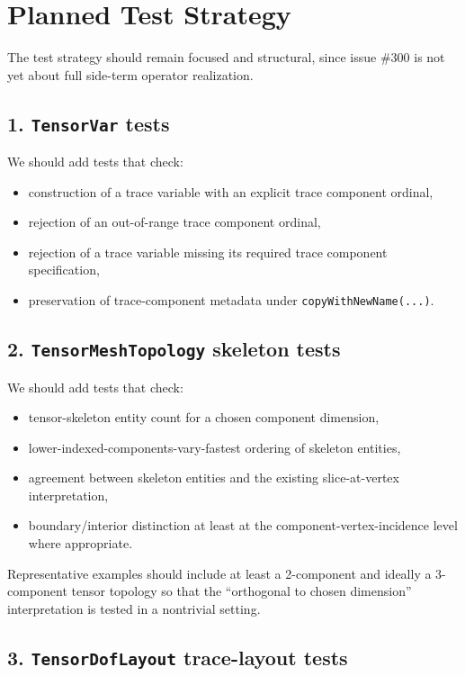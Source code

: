 \documentclass[11pt]{article}
\begin{document}
\section{Planned Test Strategy}

The test strategy should remain focused and structural, since issue \#300 is not yet about full side-term operator realization.

\subsection{1. \texttt{TensorVar} tests}

We should add tests that check:
\begin{itemize}[leftmargin=2em]
  \item construction of a trace variable with an explicit trace component ordinal,
  \item rejection of an out-of-range trace component ordinal,
  \item rejection of a trace variable missing its required trace component specification,
  \item preservation of trace-component metadata under \texttt{copyWithNewName(...)}.
\end{itemize}

\subsection{2. \texttt{TensorMeshTopology} skeleton tests}

We should add tests that check:
\begin{itemize}[leftmargin=2em]
  \item tensor-skeleton entity count for a chosen component dimension,
  \item lower-indexed-components-vary-fastest ordering of skeleton entities,
  \item agreement between skeleton entities and the existing slice-at-vertex interpretation,
  \item boundary/interior distinction at least at the component-vertex-incidence level where appropriate.
\end{itemize}

Representative examples should include at least a 2-component and ideally a 3-component tensor topology so that the ``orthogonal to chosen dimension'' interpretation is tested in a nontrivial setting.

\subsection{3. \texttt{TensorDofLayout} trace-layout tests}
\end{document}
